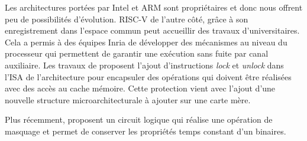 Les architectures portées par Intel et ARM sont propriétaires et donc nous offrent peu de possibilités d'évolution. RISC-V de l'autre côté, grâce à son enregistrement dans l'espace commun peut accueillir des travaux d'universitaires. Cela a permis à des équipes Inria de développer des mécanismes au niveau du processeur qui permettent de garantir une exécution sans fuite par canal auxiliaire. Les travaux de \citeauthor{twartingCT} \cite{twartingCT} proposent l'ajout d'instructions \textit{lock} et \textit{unlock} dans l'ISA de l'architecture pour encapsuler des opérations qui doivent être réalisées avec des accès au cache mémoire. Cette protection vient avec l'ajout d'une nouvelle structure microarchitecturale à ajouter sur une carte mère.\smallbreak

Plus récemment, \citeauthor{cryptoeprint:2025/1331} \cite{cryptoeprint:2025/1331} proposent un circuit logique qui réalise une opération de masquage et permet de conserver les propriétés temps constant d'un binaires.

